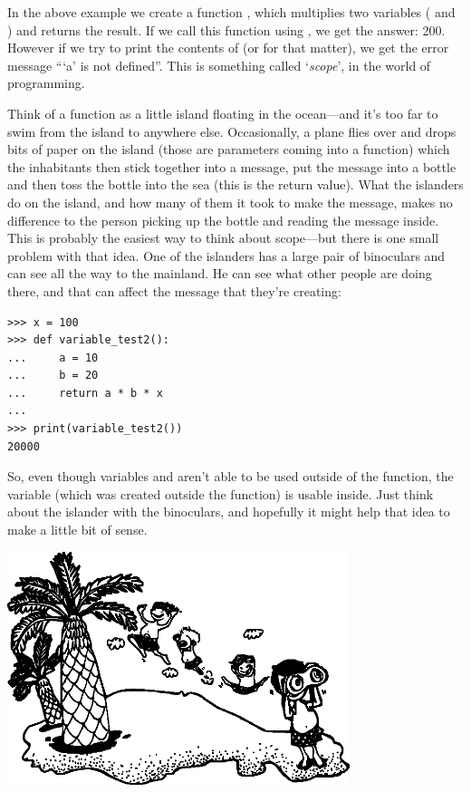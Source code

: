 In the above example we create a function , which multiplies two variables ( and ) and returns the result.  If we call this function using , we get the answer: 200.  However if we try to print the contents of  (or  for that matter), we get the error message ```a' is not defined''. This is something called `\emph{scope}', in the world of programming.
\par
Think of a function as a little island floating in the ocean---and it's too far to swim from the island to anywhere else.  Occasionally, a plane flies over and drops bits of paper on the island (those are parameters coming into a function) which the inhabitants then stick together into a message, put the message into a bottle and then toss the bottle into the sea (this is the return value).  What the islanders do on the island, and how many of them it took to make the message, makes no difference to the person picking up the bottle and reading the message inside.  This is probably the easiest way to think about scope---but there is one small problem with that idea.  One of the islanders has a large pair of binoculars and can see all the way to the mainland.  He can see what other people are doing there, and that can affect the message that they're creating:

\begin{listing}
\begin{verbatim}
>>> x = 100
>>> def variable_test2():
...     a = 10
...     b = 20
...     return a * b * x
... 
>>> print(variable_test2())
20000
\end{verbatim}
\end{listing}

So, even though variables  and  aren't able to be used outside of the function, the variable  (which was created outside the function) is usable inside.  Just think about the islander with the binoculars, and hopefully it might help that idea to make a little bit of sense.

\begin{center}
\includegraphics*[width=100mm]{eps/islanders.eps}
\end{center}

